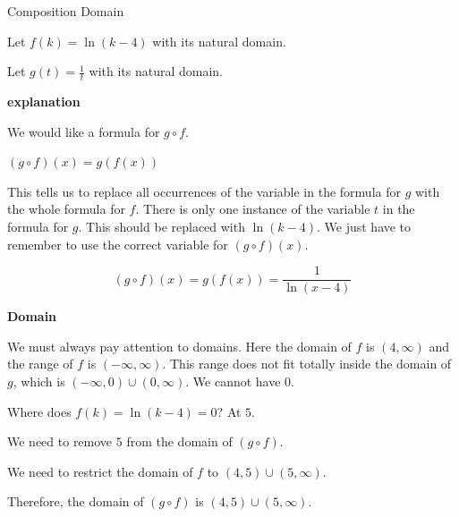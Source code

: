 \documentclass{ximera}
\begin{document}
\begin{example} Composition Domain


Let $f(k) = \ln(k - 4)$ with its natural domain.


Let $g(t) = \frac{1}{t}$ with its natural domain.



\textbf{\textcolor{red!75!green}{explanation}} 

We would like a formula for $g \circ f$. 

$(g \circ f)(x) = g(f(x))$ 

This tells us to replace all occurrences of the variable in the formula for $g$ with the whole formula for $f$.  There is only one instance of the variable $t$ in the formula for $g$.  This should be replaced with $\ln(k - 4)$. We just have to remember to use the correct variable for $(g \circ f)(x)$. 



\[
(g \circ f)(x) = g(f(x)) =  \frac{1}{\ln(x - 4)}
\]








\begin{observation} \textbf{\textcolor{-red!75}{Domain}}


We must always pay attention to domains.  Here the domain of $f$ is $(4, \infty)$ and the range of $f$ is $(-\infty, \infty)$.  This range does not fit totally inside the domain of $g$, which is $(-\infty, 0) \cup (0, \infty)$.  We cannot have $0$.  


Where does $f(k) = \ln(k - 4) = 0$? At $5$.

We need to remove $5$ from the domain of $(g \circ f)$.

We need to restrict the domain of $f$ to $(4, 5) \cup (5, \infty)$.



Therefore, the domain of $(g \circ f)$ is $(4, 5) \cup (5, \infty)$.

\end{observation}



\end{example}
\end{document}
